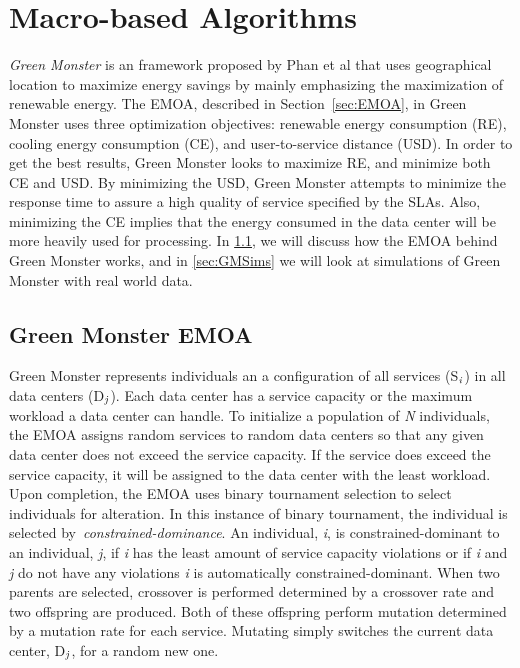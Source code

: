 \documentclass{sig-alternate}
\begin{document}
\section{Macro-based Algorithms}
\label{sec:MacAl}

\emph{Green Monster} is an framework proposed by Phan et al that uses geographical location to maximize energy savings by mainly emphasizing the maximization of renewable energy. The EMOA, described in Section~\ref{sec:EMOA}, in Green Monster uses three optimization objectives: renewable energy consumption (RE), cooling energy consumption (CE), and user-to-service distance (USD). In order to get the best results, Green Monster looks to maximize RE, and minimize both CE and USD. By minimizing the USD, Green Monster attempts to minimize the response time to assure a high quality of service specified by the SLAs. Also, minimizing the CE implies that the energy consumed in the data center will be more heavily used for processing. In \ref{sec:GMEMOA}, we will discuss how the EMOA behind Green Monster works, and in \ref{sec:GMSims} we will look at simulations of Green Monster with real world data.~\cite{Phan}

\subsection{Green Monster EMOA}
\label{sec:GMEMOA}

Green Monster represents individuals an a configuration of all services (S$_{\text{\emph{i}}}$) in all data centers (D$_{\text{\emph{j}}}$). Each data center has a service capacity
or the maximum workload a data center can handle. To initialize a population of \emph{N} individuals, the EMOA assigns random services to random data centers so that any given data center does not exceed the service capacity. If the service does exceed the service capacity, it will be assigned to the data center with the least workload. Upon completion, the EMOA uses binary tournament selection to select individuals for alteration. In this instance of binary tournament, the individual is selected by~\emph{constrained-dominance}. An individual, \emph{i},  is constrained-dominant to an individual, \emph{j}, if \emph{i} has the least amount of service capacity violations or if \emph{i} and \emph{j} do not have any violations \emph{i} is automatically constrained-dominant. When two parents are selected, crossover is performed determined by a crossover rate and two offspring are produced. Both of these offspring perform mutation determined by a mutation rate for each service. Mutating simply switches the current data center, D$_{\text{\emph{j}}}$, for a random new one.
\end{document}
